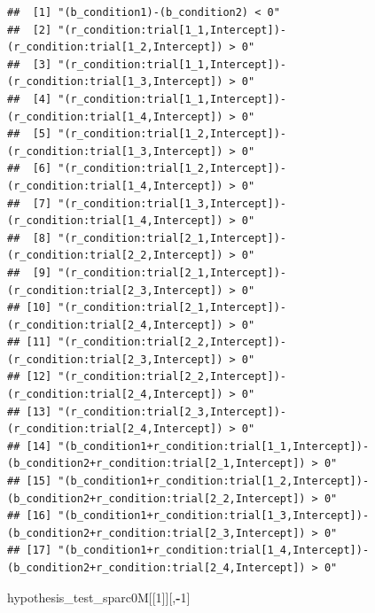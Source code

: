 \documentclass[
]{article}
\newenvironment{Shaded}{\begin{snugshade}}{\end{snugshade}}
\newcommand{\DecValTok}[1]{\textcolor[rgb]{0.00,0.00,0.81}{#1}}
\newcommand{\NormalTok}[1]{#1}
\newcommand{\SpecialCharTok}[1]{\textcolor[rgb]{0.81,0.36,0.00}{\textbf{#1}}}
\begin{document}
\begin{verbatim}
##  [1] "(b_condition1)-(b_condition2) < 0"                                                                  
##  [2] "(r_condition:trial[1_1,Intercept])-(r_condition:trial[1_2,Intercept]) > 0"                          
##  [3] "(r_condition:trial[1_1,Intercept])-(r_condition:trial[1_3,Intercept]) > 0"                          
##  [4] "(r_condition:trial[1_1,Intercept])-(r_condition:trial[1_4,Intercept]) > 0"                          
##  [5] "(r_condition:trial[1_2,Intercept])-(r_condition:trial[1_3,Intercept]) > 0"                          
##  [6] "(r_condition:trial[1_2,Intercept])-(r_condition:trial[1_4,Intercept]) > 0"                          
##  [7] "(r_condition:trial[1_3,Intercept])-(r_condition:trial[1_4,Intercept]) > 0"                          
##  [8] "(r_condition:trial[2_1,Intercept])-(r_condition:trial[2_2,Intercept]) > 0"                          
##  [9] "(r_condition:trial[2_1,Intercept])-(r_condition:trial[2_3,Intercept]) > 0"                          
## [10] "(r_condition:trial[2_1,Intercept])-(r_condition:trial[2_4,Intercept]) > 0"                          
## [11] "(r_condition:trial[2_2,Intercept])-(r_condition:trial[2_3,Intercept]) > 0"                          
## [12] "(r_condition:trial[2_2,Intercept])-(r_condition:trial[2_4,Intercept]) > 0"                          
## [13] "(r_condition:trial[2_3,Intercept])-(r_condition:trial[2_4,Intercept]) > 0"                          
## [14] "(b_condition1+r_condition:trial[1_1,Intercept])-(b_condition2+r_condition:trial[2_1,Intercept]) > 0"
## [15] "(b_condition1+r_condition:trial[1_2,Intercept])-(b_condition2+r_condition:trial[2_2,Intercept]) > 0"
## [16] "(b_condition1+r_condition:trial[1_3,Intercept])-(b_condition2+r_condition:trial[2_3,Intercept]) > 0"
## [17] "(b_condition1+r_condition:trial[1_4,Intercept])-(b_condition2+r_condition:trial[2_4,Intercept]) > 0"
\end{verbatim}

\begin{Shaded}
\begin{Highlighting}[]
\NormalTok{hypothesis\_test\_sparc0M[[}\DecValTok{1}\NormalTok{]][,}\SpecialCharTok{{-}}\DecValTok{1}\NormalTok{]}
\end{Highlighting}
\end{Shaded}
\end{document}
